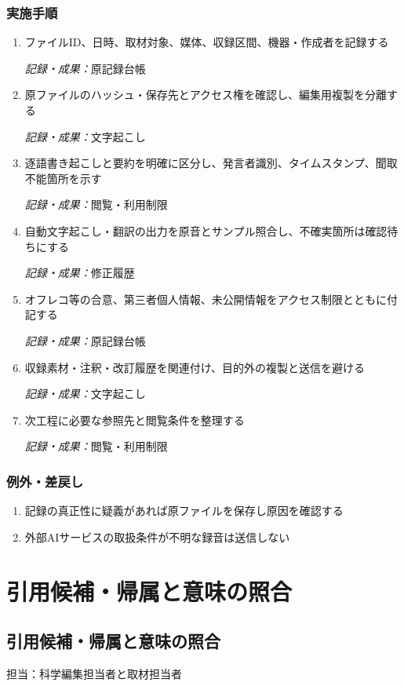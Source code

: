 \documentclass[a4paper,11pt]{article}
\begin{document}
\subsubsection*{実施手順}
\begin{enumerate}[leftmargin=2em,itemsep=0.65em]
\item ファイルID、日時、取材対象、媒体、収録区間、機器・作成者を記録する\par\noindent\textit{記録・成果：}原記録台帳\nobreak\smallskip
\item 原ファイルのハッシュ・保存先とアクセス権を確認し、編集用複製を分離する\par\noindent\textit{記録・成果：}文字起こし\nobreak\smallskip
\item 逐語書き起こしと要約を明確に区分し、発言者識別、タイムスタンプ、聞取不能箇所を示す\par\noindent\textit{記録・成果：}閲覧・利用制限\nobreak\smallskip
\item 自動文字起こし・翻訳の出力を原音とサンプル照合し、不確実箇所は確認待ちにする\par\noindent\textit{記録・成果：}修正履歴\nobreak\smallskip
\item オフレコ等の合意、第三者個人情報、未公開情報をアクセス制限とともに付記する\par\noindent\textit{記録・成果：}原記録台帳\nobreak\smallskip
\item 収録素材・注釈・改訂履歴を関連付け、目的外の複製と送信を避ける\par\noindent\textit{記録・成果：}文字起こし\nobreak\smallskip
\item 次工程に必要な参照先と閲覧条件を整理する\par\noindent\textit{記録・成果：}閲覧・利用制限\nobreak\smallskip
\end{enumerate}
\subsubsection*{例外・差戻し}
\begin{enumerate}[leftmargin=2em,itemsep=0.35em]
\item 記録の真正性に疑義があれば原ファイルを保存し原因を確認する
\item 外部AIサービスの取扱条件が不明な録音は送信しない
\end{enumerate}
\section{引用候補・帰属と意味の照合}
\subsection{引用候補・帰属と意味の照合}
\par 担当：科学編集担当者と取材担当者\par\medskip
\end{document}
